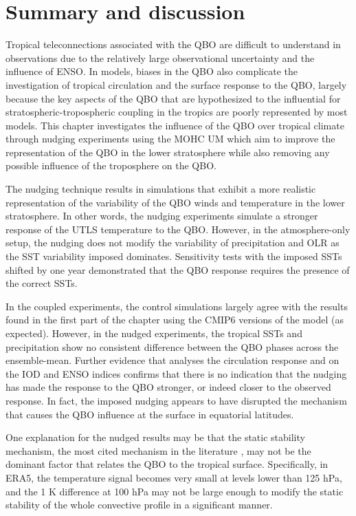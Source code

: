 \section{Summary and discussion}

Tropical teleconnections associated with the QBO are difficult to understand in observations due to the relatively large observational uncertainty and the influence of ENSO. 
In models, biases in the QBO also complicate the investigation of tropical circulation and the surface response to the QBO, largely because the key aspects of the QBO that are hypothesized to the influential for stratospheric-tropospheric coupling in the tropics are poorly represented by most models. 
This chapter investigates the influence of the QBO over tropical climate through nudging experiments using the MOHC UM which aim to improve the representation of the QBO in the lower stratosphere while also removing any possible influence of the troposphere on the QBO.  

The nudging technique results in simulations that exhibit a more realistic representation of the variability of the QBO winds and temperature in the lower stratosphere. In other words, the nudging experiments simulate a stronger response of the UTLS temperature to the QBO. 
However, in the atmosphere-only setup, the nudging does not modify the variability of precipitation and OLR as the SST variability imposed dominates. 
Sensitivity tests with the imposed SSTs shifted by one year demonstrated that the QBO response requires the presence of the correct SSTs.

In the coupled experiments, the control simulations largely agree with the results found in the first part of the chapter using the CMIP6 versions of the model (as expected). However, in the nudged experiments, the tropical SSTs and precipitation show no consistent difference between the QBO phases across the ensemble-mean.  Further evidence that analyses the circulation response and on the IOD and ENSO indices confirms that there is no indication that the nudging has made the response to the QBO stronger, or indeed closer to the observed response. In fact, the imposed nudging appears to have disrupted the mechanism that causes the QBO influence at the surface in equatorial latitudes. 

One explanation for the nudged results may be that the static stability mechanism, the most cited mechanism in the literature \citep{collimore2003,liess2012,nie2015,gray2018,lee2018}, may not be the dominant factor that relates the QBO to the tropical surface. 
Specifically, in ERA5, the temperature signal becomes very small at levels lower than 125 hPa, and the 1 K difference at 100 hPa may not be large enough to modify the static stability of the whole convective profile in a significant manner.

